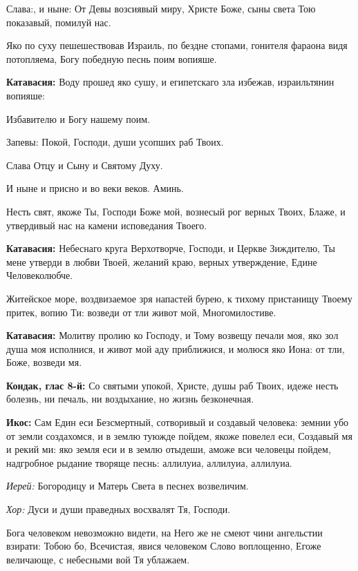 \begin{mymulticols}
Слава:, и ныне: От Девы возсиявый миру, Христе Боже, сыны света Тою показавый, помилуй нас.




 Яко по суху пешешествовав Израиль, по бездне стопами, гонителя фараона видя потопляема, Богу победную песнь поим вопияше. 

{\bfseries Катавасия:} Воду прошед яко сушу, и египетскаго зла избежав, израильтянин вопияше: 

Избавителю и Богу нашему поим. 

Запевы: Покой, Господи, души усопших раб Твоих. 

Слава Отцу и Сыну и Святому Духу. 

И ныне и присно и во веки веков. Аминь.


 Несть свят, якоже Ты, Господи Боже мой, вознесый рог верных Твоих, Блаже, и утвердивый нас на камени исповедания Твоего. 

{\bfseries Катавасия:} Небеснаго круга Верхотворче, Господи, и Церкве Зиждителю, Ты мене утверди в любви Твоей, желаний краю, верных утверждение, Едине Человеколюбче. 

 Житейское море, воздвизаемое зря напастей бурею, к тихому пристанищу Твоему притек, вопию Ти: возведи от тли живот мой, Многомилостиве. 

{\bfseries Катавасия:} Молитву пролию ко Господу, и Тому возвещу печали моя, яко зол душа моя исполнися, и живот мой аду приближися, и молюся яко Иона: от тли, Боже, возведи мя. 

{\bfseries Кондак, глас 8-й:} Со святыми упокой, Христе, душы раб Твоих, идеже несть болезнь, ни печаль, ни воздыхание, но жизнь безконечная. 

{\bfseries Икос:} Сам Един еси Безсмертный, сотворивый и создавый человека: земнии убо от земли создахомся, и в землю туюжде пойдем, якоже повелел еси, Создавый мя и рекий ми: яко земля еси и в землю отыдеши, аможе вси человецы пойдем, надгробное рыдание творяще песнь: аллилуиа, аллилуиа, аллилуиа. 

{\itshape Иерей:} Богородицу и Матерь Света в песнех возвеличим. 

{\itshape Хор:} Дуси и души праведных восхвалят Тя, Господи. 

 Бога человеком невозможно видети, на Него же не смеют чини ангельстии взирати: Тобою бо, Всечистая, явися человеком Слово воплощенно, Егоже величающе, с небесными вой Тя ублажаем. 


\end{mymulticols}

